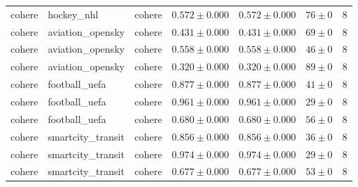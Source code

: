 \begin{table}[htbp]
\begin{tabular}{l l l r r r r}
cohere & hockey\_nhl & cohere & $0.572\pm0.000$ & $0.572\pm0.000$ & $76\pm0$ & 8 \\
cohere & aviation\_opensky & cohere & $0.431\pm0.000$ & $0.431\pm0.000$ & $69\pm0$ & 8 \\
cohere & aviation\_opensky & cohere & $0.558\pm0.000$ & $0.558\pm0.000$ & $46\pm0$ & 8 \\
cohere & aviation\_opensky & cohere & $0.320\pm0.000$ & $0.320\pm0.000$ & $89\pm0$ & 8 \\
cohere & football\_uefa & cohere & $0.877\pm0.000$ & $0.877\pm0.000$ & $41\pm0$ & 8 \\
cohere & football\_uefa & cohere & $0.961\pm0.000$ & $0.961\pm0.000$ & $29\pm0$ & 8 \\
cohere & football\_uefa & cohere & $0.680\pm0.000$ & $0.680\pm0.000$ & $56\pm0$ & 8 \\
cohere & smartcity\_transit & cohere & $0.856\pm0.000$ & $0.856\pm0.000$ & $36\pm0$ & 8 \\
cohere & smartcity\_transit & cohere & $0.974\pm0.000$ & $0.974\pm0.000$ & $29\pm0$ & 8 \\
cohere & smartcity\_transit & cohere & $0.677\pm0.000$ & $0.677\pm0.000$ & $53\pm0$ & 8 \\
\hline
\end{tabular}
\end{table}
